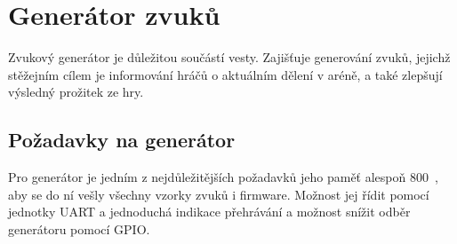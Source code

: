 \chapter{Generátor zvuků}
Zvukový generátor je důležitou součástí  vesty. Zajišťuje generování zvuků, jejichž stěžejním cílem je informování hráčů o aktuálním dělení v aréně, a také zlepšují výsledný prožitek ze hry.

\section{Požadavky na generátor}
Pro generátor je jedním z nejdůležitějších požadavků jeho paměť alespoň 800~, aby se do ní vešly všechny vzorky zvuků i firmware.  Možnost jej řídit pomocí jednotky UART a jednoduchá indikace přehrávání a možnost snížit odběr generátoru pomocí GPIO.



